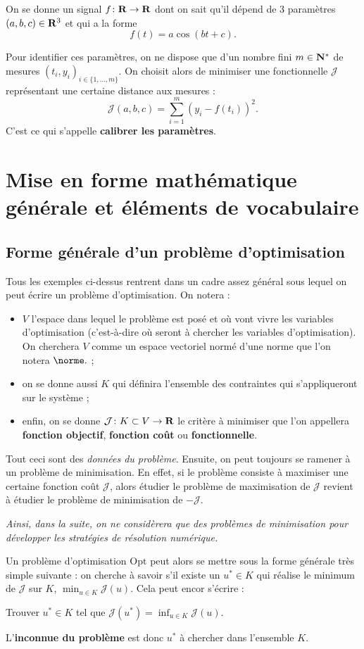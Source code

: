 \documentclass[grape]{../ceri/sty/MasterNotes}
\newcommand\J{\mathcal J}
\begin{document}
On se donne un signal $f\colon\mathbf{R}\to\mathbf{R}$ dont on sait qu'il dépend de 3 paramètres $(a,b,c)\in\mathbf{R}^3$ et qui a la forme
\[ f(t) = a\cos(bt +c). \]

Pour identifier ces paramètres, on ne dispose que d'un nombre fini $m\in\mathbf{N}^*$ de mesures $(t_i,y_i)_{i\in\{1,\ldots,m\}}$. On choisit alors de minimiser une fonctionnelle $\J$ représentant une certaine distance aux mesures :
\[ \J(a,b,c) = \sum_{i=1}^m(y_i-f(t_i))^2. \]
C'est ce qui s'appelle \textbf{calibrer les paramètres}.

\section{Mise en forme mathématique générale et éléments de vocabulaire}

\subsection{Forme générale d'un problème d'optimisation}

Tous les exemples ci-dessus rentrent dans un cadre assez général sous lequel on peut écrire un problème d'optimisation. On notera :
\begin{itemize}[wide]
    \item $V$ l'espace dans lequel le problème est posé et où vont vivre les variables d'optimisation (c'est-à-dire où seront à chercher les variables d'optimisation). On cherchera $V$ comme un espace vectoriel normé d'une norme que l'on notera $\norme.$ ;
    \item on se donne aussi $K$ qui définira l'ensemble des contraintes qui s'appliqueront sur le système ;
    \item enfin, on se donne $\J\colon K\subset V\to\R$ le critère à minimiser que l'on appellera \textbf{fonction objectif}, \textbf{fonction coût} ou \textbf{fonctionnelle}.
\end{itemize}

Tout ceci sont des \textit{données du problème}. Ensuite, on peut toujours se ramener à un problème de minimisation. En effet, si le problème consiste à maximiser une certaine fonction coût $\J$, alors étudier le problème de maximisation de $\J$ revient à étudier le problème de minimisation de $-\J$.

\textit{Ainsi, dans la suite, on ne considèrera que des problèmes de minimisation pour développer les stratégies de résolution numérique.}

Un problème d'optimisation $\mathrm{Opt}$ peut alors se mettre sous la forme générale très simple suivante : on cherche à savoir s'il existe un $u^*\in K$ qui réalise le minimum de $\J$ sur $K$, $\displaystyle\min_{u\in K}\J(u)$. Cela peut encor s'écrire :
\begin{center}
    Trouver $u^*\in K$ tel que $\J(u^*)=\displaystyle\inf_{u\in K}\J(u)$.
\end{center}
L'\textbf{inconnue du problème} est donc $u^*$ à chercher dans l'ensemble $K$.
\end{document}
